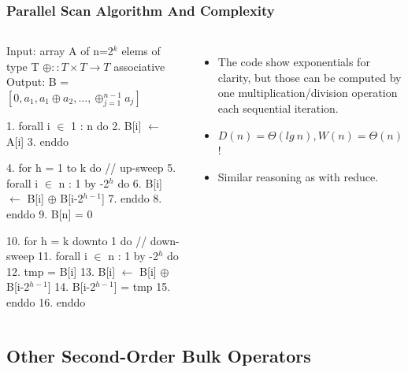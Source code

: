 \documentclass{beamer}
\renewcommand{\emph}[1]{\textcolor{structure}{#1}}
\newcommand{\emp}[1]{\textcolor{DikuRed}{ #1}}
\newcommand{\mymath}[1]{$ #1 $}
\newcommand{\myindx}[1]{_{#1}}
\newcommand{\myindu}[1]{^{#1}}
\begin{document}
\begin{frame}[fragile,t]
  \frametitle{Parallel Scan Algorithm And Complexity}
\bigskip

\begin{columns}
\begin{colorcode}[fontsize=\scriptsize]
Input:  array A of n=2\mymath{\myindu{k}} elems of type T
        \mymath{\oplus::T\times T\rightarrow T} associative
Output: B = \mymath{[0, a\myindx{1}, a\myindx{1}\oplus{}a\myindx{2},\ldots,\oplus\myindx{j=1}\myindu{n-1} a\myindx{j}]}

1.  \emph{forall i \mymath{\in} 1 : n do}
2.    B[i] \mymath{\leftarrow} A[i]
3.  \emph{enddo}

4.  \emp{for h = 1 to k do} // up-sweep
5.    \emph{forall i \mymath{\in} n : 1 by -2\mymath{\myindu{h}} do} 
6.      B[i] \mymath{\leftarrow} B[i] \mymath{\oplus} B[i-2\mymath{\myindu{h-1}}]
7.    \emph{enddo}
8.  \emp{enddo}
9.  B[n] = 0

10. \emp{for h = k downto 1 do} // down-sweep
11.   \emph{forall i \mymath{\in} n : 1 by -2\mymath{\myindu{h}} do} 
12.     tmp = B[i]
13.     B[i] \mymath{\leftarrow} B[i] \mymath{\oplus} B[i-2\mymath{\myindu{h-1}}]
14.     B[i-2\mymath{\myindu{h-1}}] = tmp
15.   \emph{enddo}
16. \emp{enddo}
\end{colorcode}
\begin{itemize} 
    \item The code show exponentials for clarity, but those can
            be computed by one multiplication/division operation
            each sequential iteration.
    \item \emp{$D(n) = \Theta(lg \ n), W(n) = \Theta(n)$!}
    \item Similar reasoning as with reduce.
\end{itemize}
\end{columns}


\end{frame}

\subsection{Other Second-Order Bulk Operators}
\end{document}
